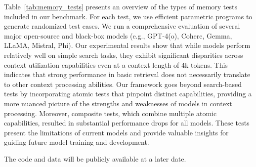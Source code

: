 Table~\ref{tab:memory_tests} presents an overview of the types of memory tests included in our benchmark. For each test, we use efficient parametric programs to generate randomized test cases. We run a comprehensive evaluation of several major open-source and black-box models (e.g., GPT-4(o), Cohere, Gemma, LLaMA, Mistral, Phi). Our experimental results show that while models perform relatively well on simple search tasks, they exhibit significant disparities across context utilization capabilities even at a context length of 4k tokens. This indicates that strong performance in basic retrieval does not necessarily translate to other context processing abilities. Our framework goes beyond search-based tests by incorporating atomic tests that pinpoint distinct capabilities, providing a more nuanced picture of the strengths and weaknesses of models in context processing. Moreover, composite tests, which combine multiple atomic capabilities, resulted in substantial performance drops for all models. These tests present the limitations of current models and provide valuable insights for guiding future model training and development.

The code and data will be publicly available at a later date.


